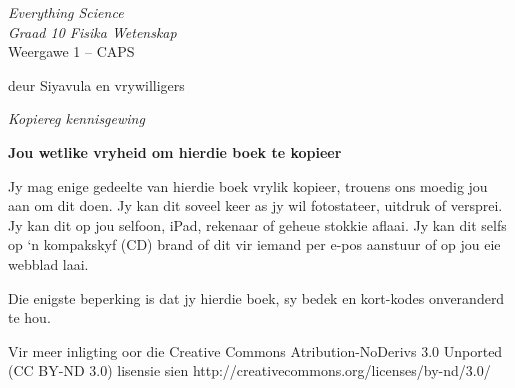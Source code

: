 
\begin{titlepage}
\begin{center}
    \thispagestyle{empty}

    \vspace*{4in}

    
    {\normalfont\sffamily\fontsize{36}\normalfont\itshape{Everything Science} \\ \vspace*{1cm}
     \normalfont\sffamily\fontsize{22}\normalfont\itshape{Graad 10 Fisika Wetenskap}}
    \vspace*{1in} \\
    \LARGE Weergawe 1 -- CAPS \\

   {\vspace*{2in}
     deur Siyavula en vrywilligers
  

\vfill

    }
\end{center}
\end{titlepage}






\newpage
\thispagestyle{empty}
\begin{center}
\normalfont\sffamily\fontsize{22}\normalfont\itshape Kopiereg kennisgewing\\

\vspace*{1in}

\textbf{Jou wetlike vryheid om hierdie boek te kopieer}\\

\end{center}

 \pagestyle{empty}
{\Large
Jy mag enige gedeelte van hierdie boek vrylik kopieer, trouens ons moedig jou aan om dit doen. Jy kan dit soveel keer as jy wil fotostateer, uitdruk of versprei. Jy kan dit op jou selfoon, iPad, rekenaar of geheue stokkie aflaai. Jy kan dit selfs op ‘n kompakskyf (CD) brand of dit vir iemand per e-pos aanstuur of op jou eie webblad laai. \par

Die enigste beperking is dat jy hierdie boek, sy bedek en kort-kodes onveranderd te hou.\par

Vir meer inligting oor die Creative Commons Atribution-NoDerivs 3.0 Unported (CC BY-ND
3.0) lisensie sien http://creativecommons.org/licenses/by-nd/3.0/}\\

